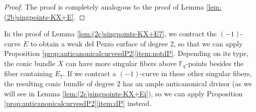 \documentclass[a4paper, 11pt, reqno]{amsart}
\numberwithin{equation}{section} \numberwithin{figure}{section}
\DeclareMathOperator{\Pic}{Pic}
\DeclareMathOperator{\Div}{Div}
\def \F {{\mathbb F}}
\def \P {{\mathbb P}}
\newcommand{\ra}{\rightarrow}
\theoremstyle{definition}
\numberwithin{lemma}{section}
\begin{document}
\begin{proof}
    The proof is completely analogous to the proof of Lemma \ref{lem:(2b)singpoints-KX+E}.

\end{proof}

In the proof of Lemma \ref{lem:(2c)singpoints-KX+E7}, we contract the $(-1)$-curve $E$ to obtain a weak del Pezzo surface of degree 2, so that we can apply Proposition \ref{prop:anticanonicalcurvesdP2}\ref{item:notdP}. Depending on its type, the conic bundle $X$ can have more singular fibers above $\F_q$-points besides the fiber containing $E_7$. If we contract a $(-1)$-curve in these other singular fibers, the resulting conic bundle of degree 2 has an ample anticanonical divisor (as we will see in Lemma \ref{lem:(2c)singpoints-KX+Ei}), so we can apply Proposition \ref{prop:anticanonicalcurvesdP2}\ref{item:dP} instead.
\end{document}
